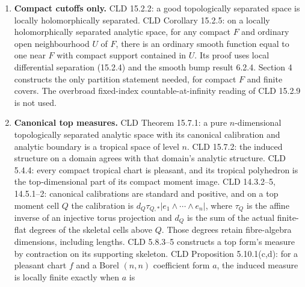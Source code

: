 \documentclass[
  11pt,
]{article}
\begin{document}
\begin{enumerate}
  Euclidean neighbourhood of the coordinate value. CLD Proposition
  15.1.1(b) gives ordinary open moment descriptions for forms in every
  bidegree. CLD 6.2.1--2 defines ordinary forms and says they form an
  ordinary sheaf stable under wedge, \(J,d',d''\). Moment pullback
  commutes with the exterior calculus (CLD 3.3.12). In a moment a
  logarithm is an affine coordinate, so \(Dt_f=0\) as a \textbf{form}.
  CLD 3.4.4: for a G-tropical chart \(f\) and a coefficient form \(a\),
  its pullback is zero in the G-form sheaf exactly when \(a\) restricts
  to zero on \(f(V)\) for every compact domain \(V\). This identifies
  the ordinary form sheaves when the analytic units, domains and moment
  images are the same; it is not descent through scalar projection.
\item
  \textbf{Compact cutoffs only.} CLD 15.2.2: a good topologically
  separated space is locally holomorphically separated. CLD Corollary
  15.2.5: on a locally holomorphically separated analytic space, for any
  compact \(F\) and ordinary open neighbourhood \(U\) of \(F\), there is
  an ordinary smooth function equal to one near \(F\) with compact
  support contained in \(U\). Its proof uses local differential
  separation (15.2.4) and the smooth bump result 6.2.4. Section 4
  constructs the only partition statement needed, for compact \(F\) and
  finite covers. The overbroad fixed-index countable-at-infinity reading
  of CLD 15.2.9 is not used.
\item
  \textbf{Canonical top measures.} CLD Theorem 15.7.1: a pure
  \(n\)-dimensional topologically separated analytic space with its
  canonical calibration and analytic boundary is a tropical space of
  level \(n\). CLD 15.7.2: the induced structure on a domain agrees with
  that domain's analytic structure. CLD 5.4.4: every compact tropical
  chart is pleasant, and its tropical polyhedron is the top-dimensional
  part of its compact moment image. CLD 14.3.2--5, 14.5.1--2: canonical
  calibrations are standard and positive, and on a top moment cell \(Q\)
  the calibration is \(d_Q\tau_{Q,*}|e_1\wedge\cdots\wedge e_n|\), where
  \(\tau_Q\) is the affine inverse of an injective torus projection and
  \(d_Q\) is the sum of the actual finite-flat degrees of the skeletal
  cells above \(Q\). Those degrees retain fibre-algebra dimensions,
  including lengths. CLD 5.8.3--5 constructs a top form's measure by
  contraction on its supporting skeleton. CLD Proposition 5.10.1(c,d):
  for a pleasant chart \(f\) and a Borel \((n,n)\) coefficient form
  \(a\), the induced measure is locally finite exactly when \(a\) is

\end{enumerate}
\end{document}
